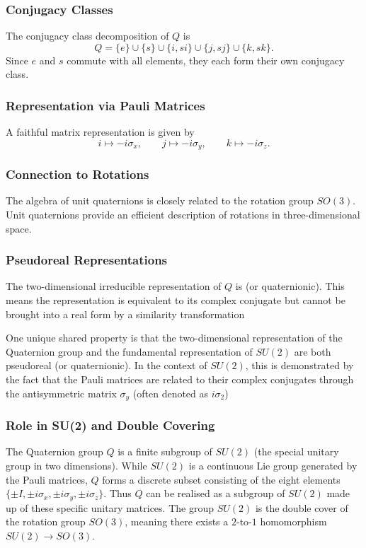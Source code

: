 \documentclass[a4paper,12pt]{article}
\theoremstyle{definition}
\begin{document}
\subsubsection*{Conjugacy Classes}

The conjugacy class decomposition of $Q$ is
\begin{equation*}
Q = \{e\} \cup \{s\} 
\cup \{i, si\} 
\cup \{j, sj\} 
\cup \{k, sk\}.
\end{equation*}
Since $e$ and $s$ commute with all elements, they each form their own conjugacy class.

\subsubsection*{Representation via Pauli Matrices}

A faithful matrix representation is given by
\begin{equation*}
i \mapsto -i\sigma_x, \qquad
j \mapsto -i\sigma_y, \qquad
k \mapsto -i\sigma_z.
\end{equation*}

\subsubsection*{Connection to Rotations}

The algebra of unit quaternions is closely related to the rotation group $SO(3)$. Unit quaternions provide an efficient description of rotations in three-dimensional space.

\subsubsection*{Pseudoreal Representations}

The two-dimensional irreducible representation of $Q$ is  (or quaternionic). This means the representation is equivalent to its complex conjugate but cannot be brought into a real form by a similarity transformation 

One unique shared property is that the two-dimensional representation of the Quaternion group and the fundamental representation of $SU(2)$ are both pseudoreal (or quaternionic). In the context of $SU(2)$, this is demonstrated by the fact that the Pauli matrices are related to their complex conjugates through the antisymmetric matrix $\sigma_y$ (often denoted as $i\sigma_2$)

\subsubsection*{ Role in SU(2) and Double Covering}
The Quaternion group $Q$ is a finite subgroup of $SU(2)$ (the special unitary group in two dimensions). 
While $SU(2)$ is a continuous Lie group generated by the Pauli matrices, $Q$ forms a discrete subset consisting of the eight elements 
$\{\pm I, \pm i\sigma_x, \pm i\sigma_y, \pm i\sigma_z\}$.
Thus $Q$ can be realised as a subgroup of $SU(2)$ made up of these specific unitary matrices. The group $SU(2)$ is the double cover of the rotation group $SO(3)$, meaning there exists a $2$-to-$1$ homomorphism 
$SU(2) \to SO(3)$. 
\end{document}

